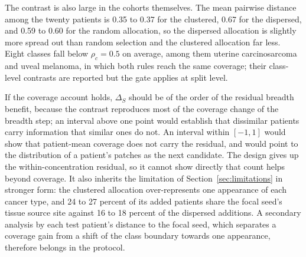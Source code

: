 \noindent The contrast is also large in the cohorts themselves. The mean pairwise distance among the twenty patients is 0.35 to 0.37 for the clustered, 0.67 for the dispersed, and 0.59 to 0.60 for the random allocation, so the dispersed allocation is slightly more spread out than random selection and the clustered allocation far less. Eight classes fall below $\rho_c=0.5$ on average, among them uterine carcinosarcoma and uveal melanoma, in which both rules reach the same coverage; their class-level contrasts are reported but the gate applies at split level.

If the coverage account holds, $\Delta_S$ should be of the order of the residual breadth benefit, because the contrast reproduces most of the coverage change of the breadth step; an interval above one point would establish that dissimilar patients carry information that similar ones do not. An interval within $[-1,1]$ would show that patient-mean coverage does not carry the residual, and would point to the distribution of a patient's patches as the next candidate. The design gives up the within-concentration residual, so it cannot show directly that count helps beyond coverage. It also inherits the limitation of Section~\ref{sec:limitations} in stronger form: the clustered allocation over-represents one appearance of each cancer type, and 24 to 27 percent of its added patients share the focal seed's tissue source site against 16 to 18 percent of the dispersed additions. A secondary analysis by each test patient's distance to the focal seed, which separates a coverage gain from a shift of the class boundary towards one appearance, therefore belongs in the protocol.
